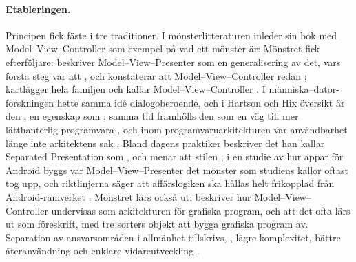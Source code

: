 \paragraph{Etableringen.}  Principen fick fäste i tre traditioner.  I
mönsterlitteraturen inleder \textcite{Gamma1994DesignPatterns} sin bok
med Model--View--Controller som exempel på vad ett mönster är:
  Mönstret fick efterföljare:
\textcite{Potel1996MVP} beskriver Model--View--Presenter som en
generalisering av det, vars första steg var att
, och konstaterar att Model--View--Controller
redan ; \textcite{SyromiatnikovWeyns2014} kartlägger hela familjen
och kallar Model--View--Controller .  I människa--dator-forskningen hette samma
idé dialogoberoende, och i Hartson och Hix
översikt\autocite{HartsonHix1989} är den
, en egenskap som
; samma
tid framhölls den som en väg till mer lätthanterlig programvara
\autocite{YipRobson1991}, och inom programvaruarkitekturen var
användbarhet länge inte arkitektens sak
.  Bland dagens praktiker beskriver
\textcite{Fowler2006GUIArchitectures} det han kallar
\foreignlanguage{english}{Separated Presentation} som
, och menar att stilen
; i en studie av
hur appar för Android byggs var Model--View--Presenter det mönster
som studiens källor oftast tog upp, och riktlinjerna säger att affärslogiken
ska hållas helt frikopplad från Android-ramverket
\autocite{Verdecchia2019Android}.  Mönstret lärs också ut:
\textcite{Tao2002MVC} beskriver hur Model--View--Controller undervisas
som arkitekturen för grafiska program, och \textcite{HansenFossum2005}
att det ofta lärs ut som föreskrift, med tre sorters objekt att bygga
grafiska program av.  Separation av ansvarsområden i allmänhet
tillskrivs, , lägre
komplexitet, bättre återanvändning och enklare vidareutveckling
\autocite{Tarr1999NDegrees}.

